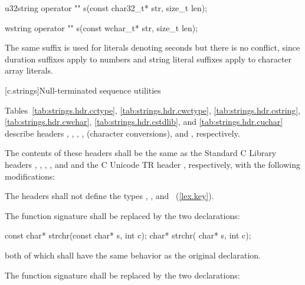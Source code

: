 \begin{itemdecl}
u32string operator "" s(const char32_t* str, size_t len);
\end{itemdecl}
\begin{itemdescr}
\pnum
\returns
{}
\end{itemdescr}

\begin{itemdecl}
wstring operator "" s(const wchar_t* str, size_t len);
\end{itemdecl}
\begin{itemdescr}
\pnum
\returns
{}
\end{itemdescr}

\pnum \enternote
The same suffix  is used for  literals denoting seconds but there is no conflict, since duration suffixes apply to numbers and string literal suffixes apply to character array literals.
\exitnote

[c.strings]{Null-terminated sequence utilities}

\pnum
Tables~\ref{tab:strings.hdr.cctype},
\ref{tab:strings.hdr.cwctype}, \ref{tab:strings.hdr.cstring},
\ref{tab:strings.hdr.cwchar},
\ref{tab:strings.hdr.cstdlib},
and \ref{tab:strings.hdr.cuchar}
describe headers
,
,
,
,
(character conversions),
 and
,
respectively.

\pnum
The contents of these headers shall be the same as the Standard C Library headers
,
,
,
,
and
and the C Unicode TR header ,
respectively, with the following modifications:

\pnum
{}%
The headers shall not define the types
, , and
~(\ref{lex.key}).

\pnum
{}%
The function signature
shall be replaced by the two declarations:

\begin{codeblock}
const char* strchr(const char* s, int c);
      char* strchr(      char* s, int c);
\end{codeblock}

both of which shall have the same behavior as the original declaration.

\pnum
{}%
The function signature
shall be replaced by the two declarations:

